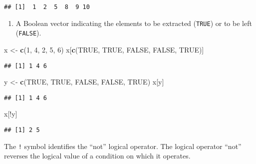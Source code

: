 \documentclass[]{book}
\newenvironment{Shaded}{\begin{snugshade}}{\end{snugshade}}
\newcommand{\KeywordTok}[1]{\textcolor[rgb]{0.13,0.29,0.53}{\textbf{{#1}}}}
\newcommand{\DecValTok}[1]{\textcolor[rgb]{0.00,0.00,0.81}{{#1}}}
\newcommand{\StringTok}[1]{\textcolor[rgb]{0.31,0.60,0.02}{{#1}}}
\newcommand{\OtherTok}[1]{\textcolor[rgb]{0.56,0.35,0.01}{{#1}}}
\newcommand{\NormalTok}[1]{{#1}}
\providecommand{\tightlist}{%
  \setlength{\itemsep}{0pt}\setlength{\parskip}{0pt}}
\def\tightlist{}
\begin{document}
\begin{verbatim}
## [1]  1  2  5  8  9 10
\end{verbatim}

\begin{enumerate}
\def\labelenumi{\arabic{enumi}.}
\setcounter{enumi}{2}
\tightlist
\item
  A Boolean vector indicating the elements to be extracted
  (\texttt{TRUE}) or to be left (\texttt{FALSE}).
\end{enumerate}

\begin{Shaded}
\begin{Highlighting}[]
\NormalTok{x <-}\StringTok{ }\KeywordTok{c}\NormalTok{(}\DecValTok{1}\NormalTok{, }\DecValTok{4}\NormalTok{, }\DecValTok{2}\NormalTok{, }\DecValTok{5}\NormalTok{, }\DecValTok{6}\NormalTok{)}
\NormalTok{x[}\KeywordTok{c}\NormalTok{(}\OtherTok{TRUE}\NormalTok{, }\OtherTok{TRUE}\NormalTok{, }\OtherTok{FALSE}\NormalTok{, }\OtherTok{FALSE}\NormalTok{, }\OtherTok{TRUE}\NormalTok{)]}
\end{Highlighting}
\end{Shaded}

\begin{verbatim}
## [1] 1 4 6
\end{verbatim}

\begin{Shaded}
\begin{Highlighting}[]
\NormalTok{y <-}\StringTok{ }\KeywordTok{c}\NormalTok{(}\OtherTok{TRUE}\NormalTok{, }\OtherTok{TRUE}\NormalTok{, }\OtherTok{FALSE}\NormalTok{, }\OtherTok{FALSE}\NormalTok{, }\OtherTok{TRUE}\NormalTok{)}
\NormalTok{x[y]}
\end{Highlighting}
\end{Shaded}

\begin{verbatim}
## [1] 1 4 6
\end{verbatim}

\begin{Shaded}
\begin{Highlighting}[]
\NormalTok{x[!y]}
\end{Highlighting}
\end{Shaded}

\begin{verbatim}
## [1] 2 5
\end{verbatim}

The \texttt{!} symbol identifies the ``not'' logical operator. The
logical operator ``not'' reverses the logical value of a condition on
which it operates.
\end{document}
